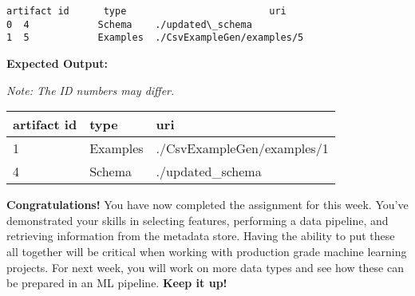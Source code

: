 \documentclass[11pt]{article}
\makeatletter
\newcommand{\boxspacing}{\kern\kvtcb@left@rule\kern\kvtcb@boxsep}
\newcommand{\prompt}[4]{
        {\ttfamily\llap{{\color{#2}[#3]:\hspace{3pt}#4}}\vspace{-\baselineskip}}
    }
\makeatother
\begin{document}
            \begin{tcolorbox}[breakable, size=fbox, boxrule=.5pt, pad at break*=1mm, opacityfill=0]
\prompt{Out}{outcolor}{88}{\boxspacing}
\begin{Verbatim}[commandchars=\\\{\}]
   artifact id      type                         uri
0  4            Schema    ./updated\_schema
1  5            Examples  ./CsvExampleGen/examples/5
\end{Verbatim}
\end{tcolorbox}
        
    \textbf{Expected Output:}

\emph{Note: The ID numbers may differ.}

\begin{longtable}[]{@{}lll@{}}
\toprule
artifact id & type & uri \\
\midrule
\endhead
1 & Examples & ./CsvExampleGen/examples/1 \\
4 & Schema & ./updated\_schema \\
\bottomrule
\end{longtable}

    \textbf{Congratulations!} You have now completed the assignment for this
week. You've demonstrated your skills in selecting features, performing
a data pipeline, and retrieving information from the metadata store.
Having the ability to put these all together will be critical when
working with production grade machine learning projects. For next week,
you will work on more data types and see how these can be prepared in an
ML pipeline. \textbf{Keep it up!}


    
    
    
\end{document}
